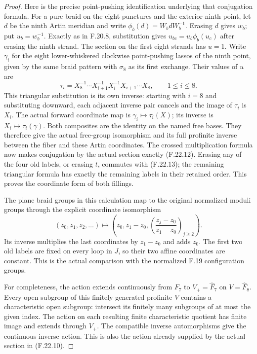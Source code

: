 \begin{proof}
Here is the precise point-pushing identification
underlying that conjugation formula. For a pure
braid on the eight punctures and the exterior ninth
point, let $d$ be the ninth Artin meridian and write
$\phi_b(d)=W_bdW_b^{-1}$. Erasing $d$ gives $w_b$;
put $u_b=w_b^{-1}$. Exactly as in F.20.8, substitution
gives $u_{bc}=u_b\phi_b(u_c)$ after erasing the ninth
strand. The section on the first eight strands has
$u=1$. Write $\gamma_i$ for the eight lower-whiskered
clockwise point-pushing lassos of the ninth point,
given by the same braid pattern with $\sigma_8$ as
its first exchange. Their values of $u$ are
\[
       \tau_i=X_8^{-1}\cdots X_{i+1}^{-1}
                    X_i^{-1}X_{i+1}\cdots X_8,
                \qquad1\leq i\leq8.
                                                               \tag{F.22.13}
\]
This triangular substitution is its own inverse:
starting with $i=8$ and substituting downward,
each adjacent inverse pair cancels and the image
of $\tau_i$ is $X_i$. The actual forward coordinate
map is $\gamma_i\mapsto\tau_i(X)$; its inverse is
$X_i\mapsto\tau_i(\gamma)$. Both composites are
the identity on the named free bases. They therefore
give the actual free-group isomorphism and its full
profinite inverse between the fiber and these Artin
coordinates. The crossed multiplication formula now
makes conjugation by the actual section exactly
(F.22.12). Erasing any of the four old labels,
or erasing $t$, commutes with (F.22.13); the
remaining triangular formula has exactly the
remaining labels in their retained order.
This proves the coordinate form of both fillings.

The plane braid groups in this calculation map
to the original normalized moduli groups through
the explicit coordinate isomorphism
\[
 (z_0,z_1,z_2,\ldots)
   \longmapsto
 \left(z_0,z_1-z_0,
           \left(\frac{z_j-z_0}{z_1-z_0}\right)_{j\geq2}\right).
                                                               \tag{F.22.14}
\]
Its inverse multiplies the last coordinates by
$z_1-z_0$ and adds $z_0$. The first two old labels
are fixed on every loop in $J$, so their two
affine coordinates are constant. This is the
actual comparison with the normalized F.19
configuration groups.

For completeness, the action extends continuously
from $F_7$ to $V_+=\widehat F_7$ on $V=\widehat F_8$.
Every open subgroup of this finitely generated
profinite $V$ contains a characteristic open
subgroup: intersect its finitely many subgroups
of at most the given index. The action on each
resulting finite characteristic quotient has
finite image and extends through $V_+$.
The compatible inverse automorphisms give the
continuous inverse action. This is also the
action already supplied by the actual section
in (F.22.10).


\end{proof}
